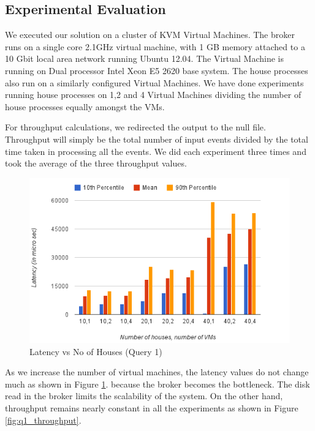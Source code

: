 \subsection{Experimental Evaluation}
We executed our solution on a cluster of KVM \cite{kvm}  Virtual Machines.
The broker runs on a single core 2.1GHz virtual machine, with 1 GB memory attached to a 10 Gbit local area network running Ubuntu 12.04.
The Virtual Machine is running on Dual processor Intel Xeon E5 2620 base system.
The house processes also run on a similarly configured Virtual Machines.
We have done experiments running house processes on 1,2 and 4 Virtual Machines dividing the number of house processes equally amongst the VMs.

For throughput calculations, we redirected the output to the null file.
Throughput will simply be the total number of input events divided by the total time taken in processing all the events.
We did each experiment three times and took the average of the three throughput values.
\begin{figure}[h]
\begin{center}
	\includegraphics[scale=0.6]{img/q1_latency}
	\vspace*{-0.4cm}
	\caption{Latency vs No of Houses (Query 1) \label{fig:q1_latency}}
\end{center}
\end{figure}

As we increase the number of virtual machines, the latency values do not change much as shown in Figure \ref{fig:q1_latency}.
because the broker becomes the bottleneck.
The disk read in the broker limits the scalability of the system.
On the other hand, throughput remains nearly constant in all the experiments as shown in Figure \ref{fig:q1_throughput}.

